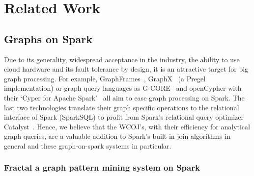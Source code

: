 \section{Related Work} \label{sec:related-work}


\subsection{Graphs on Spark}
Due to its generality, widespread acceptance in the industry, the ability to use cloud hardware and its fault tolerance by design, it is an attractive target for big graph processing.
For example, GraphFrames~\cite{graphframe}, GraphX~\cite{graphx} (a Pregel~\cite{pregel} implementation) or graph query languages as \mbox{G-CORE}~\cite{gcore} and \mbox{openCypher} with their `Cyper for Apache Spark'~\cite{caps} all aim to ease graph processing on Spark.
The last two technologies translate their graph specific operations to the relational interface of Spark (SparkSQL) to profit from Spark's relational query optimizer Catalyst~\cite{spark-sql}.
Hence, we believe that the WCOJ's, with their efficiency for analytical graph queries, are a valuable addition to Spark's built-in join algorithms in general and these graph-on-spark systems in particular.


\subsubsection{Fractal a graph pattern mining system on Spark}

